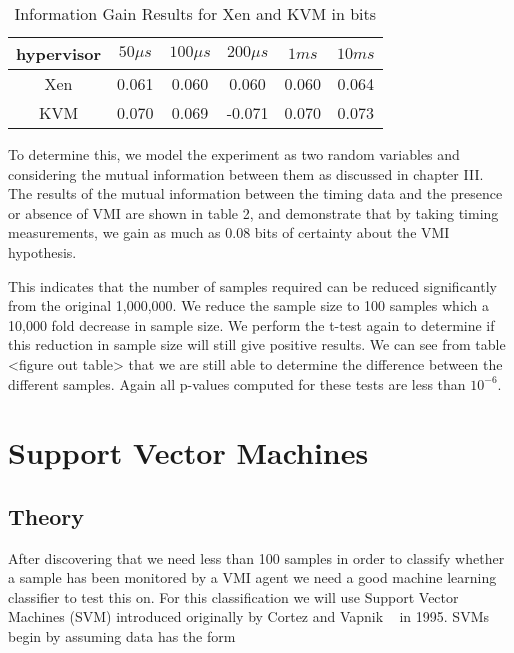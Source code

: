 \begin{center}\label{InfoGainsCacheAttack}
	\begin{table}
	  	\begin{tabular}{| c | c | c | c | c | c |}
		    \hline
		    hypervisor & $50\mu s$ & $100\mu s$ & $200 \mu s$ & $1ms$ & $10ms$ \\ \hline
		    Xen & 0.061 & 0.060 & 0.060 & 0.060 & 0.064 \\ \hline 
		    KVM & 0.070 & 0.069 & -0.071 & 0.070 & 0.073 \\ \hline   
		\end{tabular}
		\caption{Information Gain Results for Xen and KVM in bits}
  \end{table}
\end{center}


To determine this, we model the experiment as two random variables and considering the mutual information between them as discussed in chapter III. The results of the mutual information between the timing data and the presence or absence of VMI are shown in table 2, and demonstrate that by taking timing measurements, we gain as much as 0.08 bits of certainty about the VMI hypothesis. 


This indicates that the number of samples required can be reduced significantly from the original 1,000,000. We reduce the sample size to 100 samples which a 10,000 fold decrease in sample size. We perform the t-test again to determine if this reduction in sample size will still give positive results.  We can see from table <figure out table> that we are still able to determine the difference between the different samples. Again all p-values computed for these tests are less than $10^{−6}$. 


\section{Support Vector Machines}

\subsection{Theory}
After discovering that we need less than 100 samples in order to classify whether a sample has been monitored by a VMI agent we need a good machine learning classifier to test this on. For this classification we will use Support Vector Machines (SVM) introduced originally by Cortez and Vapnik ~\cite{cortes1995support} in 1995. SVMs begin by assuming data has the form 


